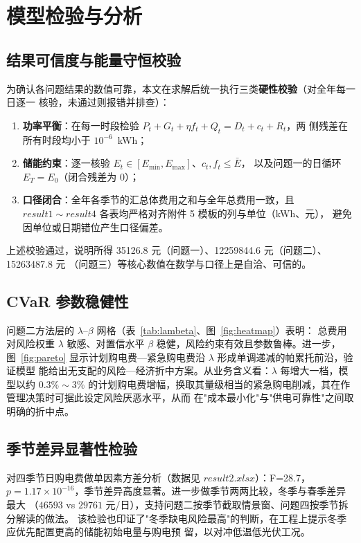 \documentclass[withoutpreface]{cumcmthesis}
\begin{document}
\section{模型检验与分析}
\subsection{结果可信度与能量守恒校验}
为确认各问题结果的数值可靠，本文在求解后统一执行三类\textbf{硬性校验}（对全年每一日逐一
核验，未通过则报错并排查）：
\begin{enumerate}
    \item \textbf{功率平衡}：在每一时段检验 $P_t+G_t+\eta f_t+Q_t = D_t+c_t+R_t$，两
          侧残差在所有时段均小于 $10^{-6}$~kWh；
    \item \textbf{储能约束}：逐一核验 $E_t\in[E_{\min},E_{\max}]$、$c_t,f_t\le\bar{E}$，
          以及问题一的日循环 $E_T=E_0$（闭合残差为 0）；
    \item \textbf{口径闭合}：全年各季节的汇总体费用之和与全年总费用一致，且
          $result1\sim result4$ 各表均严格对齐附件 5 模板的列与单位（kWh、元），
          避免因单位或日期错位产生口径偏差。
\end{enumerate}
上述校验通过，说明所得 35126.8 元（问题一）、12259844.6 元（问题二）、15263487.8 元
（问题三）等核心数值在数学与口径上是自洽、可信的。

\subsection{CVaR 参数稳健性}
问题二方法层的 $\lambda$--$\beta$ 网格（表~\ref{tab:lambeta}、图~\ref{fig:heatmap}）表明：
总费用对风险权重 $\lambda$ 敏感、对置信水平 $\beta$ 稳健，风险约束有效且参数鲁棒。进一步，
图~\ref{fig:pareto} 显示计划购电费—紧急购电费沿 $\lambda$ 形成单调递减的帕累托前沿，验证模型
能给出无支配的风险—经济折中方案。从业务含义看：$\lambda$ 每增大一档，模型以约 $0.3\%\sim3\%$
的计划购电费增幅，换取其量级相当的紧急购电削减，其在作管理决策时可据此设定风险厌恶水平，从而
在"成本最小化"与"供电可靠性"之间取明确的折中点。

\subsection{季节差异显著性检验}
对四季节日购电费做单因素方差分析（数据见 $result2.xlsx$）：F=28.7，
$p=1.17\times10^{-16}$，季节差异高度显著。进一步做季节两两比较，冬季与春季差异最大
（$46593$ vs $29761$ 元/日），支持问题二按季节截取情景窗、问题四按季节拆分解读的做法。
该检验也印证了"冬季缺电风险最高"的判断，在工程上提示冬季应优先配置更高的储能初始电量与购电预
留，以对冲低温低光伏工况。
\end{document}
